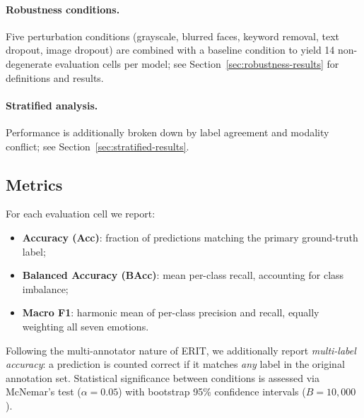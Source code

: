 \paragraph{Robustness conditions.}
Five perturbation conditions (grayscale, blurred faces, keyword removal,
text dropout, image dropout) are combined with a baseline condition to
yield 14 non-degenerate evaluation cells per model; see
Section~\ref{sec:robustness-results} for definitions and results.

\paragraph{Stratified analysis.}
Performance is additionally broken down by label agreement and modality
conflict; see Section~\ref{sec:stratified-results}.



\subsection{Metrics}
\label{sec:metrics}

For each evaluation cell we report:
\begin{itemize}[nosep]
  \item \textbf{Accuracy (Acc)}: fraction of predictions matching the
        primary ground-truth label;
  \item \textbf{Balanced Accuracy (BAcc)}: mean per-class recall,
        accounting for class imbalance;
  \item \textbf{Macro F1}: harmonic mean of per-class precision and
        recall, equally weighting all seven emotions.
\end{itemize}

\noindent
Following the multi-annotator nature of ERIT, we additionally report
\emph{multi-label accuracy}: a prediction is counted correct if it matches
\emph{any} label in the original annotation set.
Statistical significance between conditions is assessed via McNemar's test
($\alpha = 0.05$) with bootstrap 95\% confidence intervals ($B = 10{,}000$).
